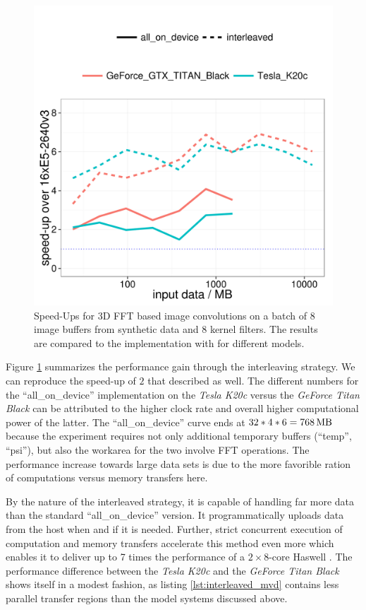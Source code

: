 \begin{figure}[hbt]
  \centering
    \includegraphics[width=\textwidth]{plots/deconvolve_synthetic_gpu_speed_up}
  \caption{Speed-Ups for 3D FFT based image convolutions on a batch of 8 image buffers from synthetic data and 8 kernel filters. The results are compared to the \cpu{} implementation with \fftw{} for different \gpu{} models.}
  \label{fig:synthetic_deconvolution}
\end{figure}

Figure \ref{fig:synthetic_deconvolution} summarizes the performance gain through the interleaving strategy. We can reproduce the speed-up of $2$ that \cite{2013arXiv1308.0730P} described as well. The different numbers for the ``all\_on\_device'' implementation on the \textit{Tesla K20c} versus the \textit{GeForce Titan Black} can be attributed to the higher clock rate and overall higher computational power of the latter. The ``all\_on\_device'' curve ends at $\unit[32*4*6 = 768]{MB}$ because the experiment requires not only additional temporary buffers (``temp'', ``psi''), but also the workarea for the two involve FFT operations. The performance increase towards large data sets is due to the more favorible ration of computations versus memory transfers here.\newline

By the nature of the interleaved strategy, it is capable of handling far more data than the standard ``all\_on\_device'' version. It programmatically uploads data from the \gpu{} host when and if it is needed. Further, strict concurrent execution of computation and memory transfers accelerate this method even more which enables it to deliver up to 7 times the performance of a $2\times{}8$-core Haswell \cpu{}. The performance difference between the \textit{Tesla K20c} and the \textit{GeForce Titan Black} shows itself in a modest fashion, as listing \ref{lst:interleaved_mvd} contains less parallel transfer regions than the model systems discussed above.


